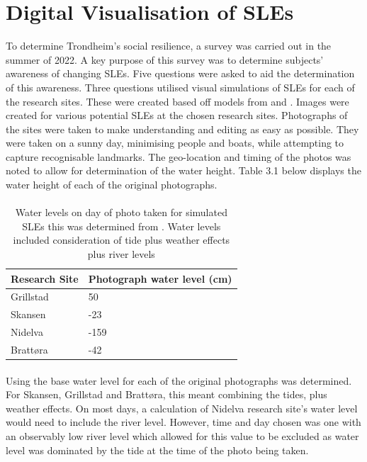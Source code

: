 \section{Digital Visualisation of SLEs}
To determine Trondheim's social resilience, a survey was carried out in the summer of 2022. A key purpose of this survey was to determine subjects' awareness of changing SLEs.  Five questions were asked to aid the determination of this awareness. Three questions utilised visual simulations of SLEs for each of the research sites. These were created based off models from \cite{dsb_integrating-sea-level-rise-and-storm-surges--local-planningpdf_2017} and \cite{kartverket_se_2020}. Images were created for various potential SLEs at the chosen research sites. Photographs of the sites were taken to make understanding and editing as easy as possible. They were taken on a sunny day, minimising people and boats, while attempting to capture recognisable landmarks. The geo-location and timing of the photos was noted to allow for determination of the water height. Table 3.1 below displays the water height of each of the original photographs. 
\paragraph{}

\begin{table}[h!]
    \centering
    \begin{tabular}{|l|l|}
        \hline
     	\textbf{Research Site} & \textbf{Photograph water level (cm)} \\ \hline
            Grillstad & 50 \\ \hline
            Skansen & -23 \\ \hline
            Nidelva & -159 \\ \hline
            Brattøra	& -42 \\ \hline
    \end{tabular}
    \caption{Water levels on day of photo taken for simulated SLEs this was determined from \cite{tides_high_2022}. Water levels included consideration of tide plus weather effects plus river levels}
    \label{tab:water_level_photo}
\end{table}
\paragraph{}

Using \cite{tides_high_2022} the base water level for each of the original photographs was determined. For Skansen, Grillstad and Brattøra, this meant combining the tides, plus weather effects. On most days, a calculation of Nidelva research site's water level would need to include the river level. However, time and day chosen was one with an observably low river level which allowed for this value to be excluded as water level was dominated by the tide at the time of the photo being taken.   
